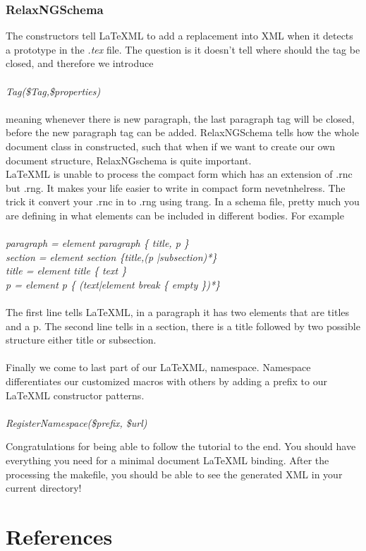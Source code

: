 \documentclass{book}
\begin{document}
\subsection{RelaxNGSchema}
The constructors tell \LaTeX ML to add a replacement into XML when it detects a prototype in the \emph{.tex} file. The question is it doesn't tell
where should the tag be closed, and therefore we introduce \\ \\
 \emph{Tag(\$Tag,\$properties)} \\ \\
 meaning whenever there is new paragraph, the last paragraph tag will be closed, before the new paragraph tag can be added. RelaxNGSchema
 tells how the whole document class in constructed, such that when if we want to create our own document structure, RelaxNGschema is quite important. \\
 \LaTeX ML is unable to process the compact form which has an extension of .rnc but .rng. It makes your life easier to write in compact form nevetnhelress.
 The trick it convert your .rnc in to .rng using trang. In a schema file, pretty much you are defining in what elements can be included in different bodies. For example \\ \\
\emph{paragraph = element paragraph \{ title, p \} \\
section = element section \{title,(p |subsection)*\} \\
title = element title \{ text \} \\ 
p = element p \{ (text|element break \{ empty \})*\} }\\ \\ 
The first line tells \LaTeX ML, in a paragraph it has two elements that are titles and a p. The second line tells in a section, there is a title followed by two possible \\
structure either title or subsection. \\ \\
Finally we come to last part of our \LaTeX ML, namespace. Namespace differentiates our customized macros with others by adding a prefix to our \LaTeX ML constructor patterns. \\ \\
\emph{RegisterNamespace(\$prefix, \$url) \\} 

Congratulations for being able to follow the tutorial to the end. You should have everything you need for a minimal document \LaTeX ML binding. After the processing the makefile, you should be able to see the generated XML in your current directory!

\chapter{References}
\end{document}
